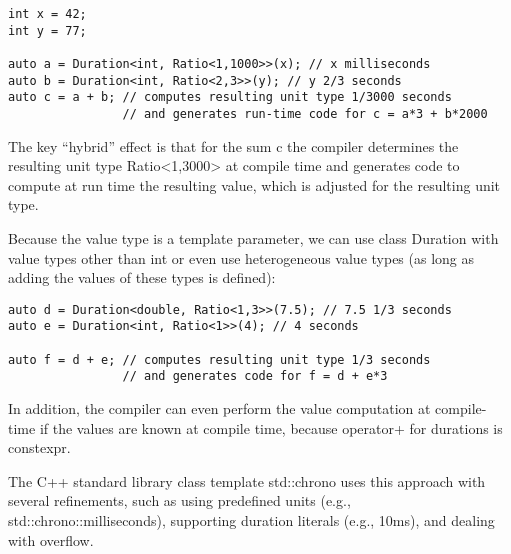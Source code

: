 \begin{lstlisting}[style=styleCXX]
int x = 42;
int y = 77;

auto a = Duration<int, Ratio<1,1000>>(x); // x milliseconds
auto b = Duration<int, Ratio<2,3>>(y); // y 2/3 seconds
auto c = a + b; // computes resulting unit type 1/3000 seconds
				// and generates run-time code for c = a*3 + b*2000
\end{lstlisting}

The key “hybrid” effect is that for the sum c the compiler determines the resulting unit type Ratio<1,3000> at compile time and generates code to compute at run time the resulting value, which is adjusted for the resulting unit type.

Because the value type is a template parameter, we can use class Duration with value types other than int or even use heterogeneous value types (as long as adding the values of these types is defined):

\begin{lstlisting}[style=styleCXX]
auto d = Duration<double, Ratio<1,3>>(7.5); // 7.5 1/3 seconds
auto e = Duration<int, Ratio<1>>(4); // 4 seconds

auto f = d + e; // computes resulting unit type 1/3 seconds
				// and generates code for f = d + e*3
\end{lstlisting}

In addition, the compiler can even perform the value computation at compile-time if the values are known at compile time, because operator+ for durations is constexpr.

The C++ standard library class template std::chrono uses this approach with several refinements, such as using predefined units (e.g., std::chrono::milliseconds), supporting duration literals (e.g., 10ms), and dealing with overflow.































